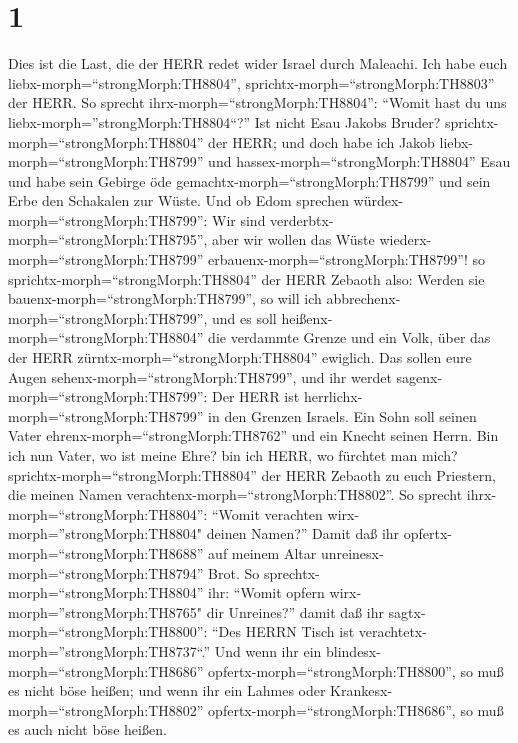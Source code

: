 \hypertarget{section}{%
\section{1}\label{section}}

 Dies ist die Last, die der HERR redet wider Israel durch
Maleachi.  Ich habe euch liebx-morph=``strongMorph:TH8804'',
sprichtx-morph=``strongMorph:TH8803'' der HERR. So sprecht
ihrx-morph=``strongMorph:TH8804'': ``Womit hast du uns
liebx-morph=''strongMorph:TH8804``?'' Ist nicht Esau Jakobs Bruder?
sprichtx-morph=``strongMorph:TH8804'' der HERR; und doch habe ich Jakob
liebx-morph=``strongMorph:TH8799''  und
hassex-morph=``strongMorph:TH8804'' Esau und habe sein Gebirge öde
gemachtx-morph=``strongMorph:TH8799'' und sein Erbe den Schakalen zur
Wüste.  Und ob Edom sprechen
würdex-morph=``strongMorph:TH8799'': Wir sind
verderbtx-morph=``strongMorph:TH8795'', aber wir wollen das Wüste
wiederx-morph=``strongMorph:TH8799''
erbauenx-morph=``strongMorph:TH8799''! so
sprichtx-morph=``strongMorph:TH8804'' der HERR Zebaoth also: Werden sie
bauenx-morph=``strongMorph:TH8799'', so will ich
abbrechenx-morph=``strongMorph:TH8799'', und es soll
heißenx-morph=``strongMorph:TH8804'' die verdammte Grenze und ein Volk,
über das der HERR zürntx-morph=``strongMorph:TH8804'' ewiglich.
 Das sollen eure Augen sehenx-morph=``strongMorph:TH8799'',
und ihr werdet sagenx-morph=``strongMorph:TH8799'': Der HERR ist
herrlichx-morph=``strongMorph:TH8799'' in den Grenzen Israels.
 Ein Sohn soll seinen Vater
ehrenx-morph=``strongMorph:TH8762'' und ein Knecht seinen Herrn. Bin ich
nun Vater, wo ist meine Ehre? bin ich HERR, wo fürchtet man mich?
sprichtx-morph=``strongMorph:TH8804'' der HERR Zebaoth zu euch
Priestern, die meinen Namen verachtenx-morph=``strongMorph:TH8802''. So
sprecht ihrx-morph=``strongMorph:TH8804'': ``Womit verachten
wirx-morph=''strongMorph:TH8804" deinen Namen?''  Damit daß
ihr opfertx-morph=``strongMorph:TH8688'' auf meinem Altar
unreinesx-morph=``strongMorph:TH8794'' Brot. So
sprechtx-morph=``strongMorph:TH8804'' ihr: ``Womit opfern
wirx-morph=''strongMorph:TH8765" dir Unreines?'' damit daß ihr
sagtx-morph=``strongMorph:TH8800'': ``Des HERRN Tisch ist
verachtetx-morph=''strongMorph:TH8737``.''  Und wenn ihr ein
blindesx-morph=``strongMorph:TH8686''
opfertx-morph=``strongMorph:TH8800'', so muß es nicht böse heißen; und
wenn ihr ein Lahmes oder Krankesx-morph=``strongMorph:TH8802''
opfertx-morph=``strongMorph:TH8686'', so muß es auch nicht böse heißen.
